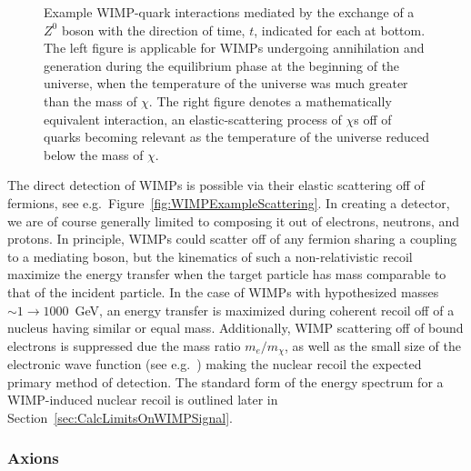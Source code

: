 			\begin{figure}
				\centering
				\def\figheight{0.4\textwidth}
				\caption[Relevant WIMP-quark interactions during hot and cold universe epochs.]{Example WIMP-quark 
				interactions mediated by the exchange of a $Z^{0}$ boson with the direction
				of time, $t$, indicated for each at bottom.  The left figure is applicable for WIMPs undergoing annihilation and 
				generation during the equilibrium phase at
				the beginning of the universe, when the temperature of the universe was much greater than the mass of $\chi$.
				The right figure denotes a mathematically equivalent interaction, an elastic-scattering process
				of $\chi$s off of quarks becoming relevant as the temperature of the universe reduced below the mass of $\chi$.}
				\label{fig:WIMPExample}
			\end{figure}	
			
	The direct detection of WIMPs is possible via their elastic scattering off of fermions, see e.g.~Figure~\ref{fig:WIMPExampleScattering}.  In creating a detector, we are of course generally limited to composing it out of electrons, neutrons, and protons.  In principle, WIMPs could scatter off of any fermion sharing a coupling to a mediating boson, but the kinematics of such a non-relativistic recoil maximize the energy transfer when the target particle has mass comparable to that of the incident particle.  In the case of WIMPs with hypothesized masses $\sim1\to1000$~GeV, an energy transfer is maximized during coherent recoil off of a nucleus having similar or equal mass.  Additionally, WIMP scattering off of bound electrons is suppressed due the mass ratio $m_{e}/m_{\chi}$, as well as the small size of the electronic wave function (see e.g.~\cite{Kopp09}) making the nuclear recoil the expected primary method of detection.  The standard form of the energy spectrum for a WIMP-induced nuclear recoil is outlined later in Section~\ref{sec:CalcLimitsOnWIMPSignal}.
	
			\subsubsection{Axions}
	
